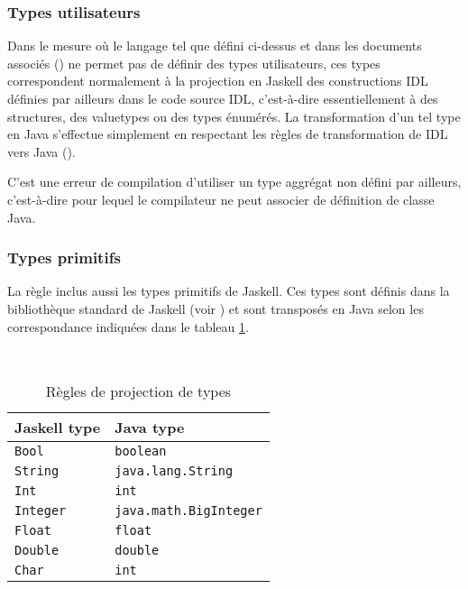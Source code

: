 \subsubsection{Types utilisateurs}

Dans le mesure o\`u le langage tel que d\'efini ci-dessus et dans les
documents associ\'es (\cite{fidlspec}) ne permet pas de d\'efinir des types utilisateurs,
ces types correspondent normalement \`a la projection en Jaskell des
constructions IDL d\'efinies par ailleurs dans le code source IDL,
c'est-\`a-dire essentiellement \`a des structures, des \textsf{valuetypes}
ou des types \'enum\'er\'es. La transformation d'un tel type en Java
s'effectue simplement en respectant les r\`egles de transformation de
IDL vers Java (\cite{idl2java}). 

C'est une erreur de compilation d'utiliser un type aggr\'egat non d\'efini
par ailleurs, c'est-\`a-dire pour lequel le compilateur ne peut associer
de d\'efinition de classe Java. 

\subsubsection{Types primitifs}

La r\`egle  inclus aussi les types primitifs de
Jaskell. Ces types sont d\'efinis dans la biblioth\`eque standard de
Jaskell (voir \cite{fidlspec}) et sont transpos\'es en Java selon les
correspondance indiqu\'ees dans le tableau \ref{tab:typemap}.

\begin{table}\
\caption{R\`egles de projection de types}
\label{tab:typemap}
\begin{center}
\begin{tabular}{|l@{$\qquad\longrightarrow\qquad$}l|}
\hline
Jaskell type & Java type \\
\hline
\hline
\texttt{Bool} & \texttt{boolean} \\
\hline
\texttt{String} & \texttt{java.lang.String} \\
\hline
\texttt{Int} & \texttt{int} \\
\hline
\texttt{Integer} & \texttt{java.math.BigInteger} \\
\hline
\texttt{Float} & \texttt{float} \\
\hline
\texttt{Double} & \texttt{double} \\
\hline
\texttt{Char} & \texttt{int} \\
\hline
\end{tabular}
\end{center}
\end{table}

